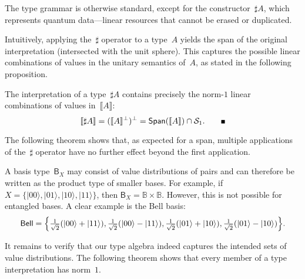 \documentclass[runningheads,orivec,envcountsame,envcountsect]{llncs}
\providecommand{\qed}{\hbox{\rule{1ex}{1ex}}}%
\newcommand\ket[1]{\ensuremath{|#1\rangle}}
\newcommand\Span[1]{\ensuremath{{\mathsf{Span}}{#1}}}
\def\Sph{\mathcal{S}_1}       %
\def\sem#1{\llbracket#1\rrbracket}
\newcommand\B{\mathbb B}
\newcommand\basis[1]{\ensuremath{\mathsf{B}_{#1}}}
\begin{document}
The type grammar is otherwise standard, except for the constructor~$\sharp A$,
which represents quantum data---linear resources that cannot be erased or
duplicated.  

Intuitively, applying the~$\sharp$ operator to a type~$A$ yields the span of the
original interpretation (intersected with the unit sphere).  This captures the
possible linear combinations of values in the unitary semantics of~$A$, as
stated in the following proposition.

\begin{theorem}\label{thm:SharpCharacterization}
  The interpretation of a type~$\sharp A$ contains precisely the
  norm-$1$ linear combinations of values in~$\sem{A}$:
  \[
    \sem{\sharp A}
    = (\sem{A}^\bot)^\bot
    = \Span(\sem{A}) \cap \Sph.
    \tag*{\qed}
  \]
\end{theorem}



The following theorem shows that, as expected for a span, multiple
applications of the~$\sharp$ operator have no further effect beyond the first
application.


\begin{remark}
  A basis type~$\basis{X}$ may consist of value distributions of pairs and can
  therefore be written as the product type of smaller bases. For example, if
  $X=\{\ket{00},\ket{01},\ket{10},\ket{11}\}$, then $\basis{X}=\B\times\B$.
  However, this is not possible for entangled bases. A clear example is the
  Bell basis:
  \[
    \mathsf{Bell}
    =\Bigl\{
      \tfrac{1}{\sqrt{2}}(\ket{00}+\ket{11}),
      \tfrac{1}{\sqrt{2}}(\ket{00}-\ket{11}),
      \tfrac{1}{\sqrt{2}}(\ket{01}+\ket{10}),
      \tfrac{1}{\sqrt{2}}(\ket{01}-\ket{10})
    \Bigr\}.
  \]
\end{remark}

It remains to verify that our type algebra indeed captures the intended sets of
value distributions. The following theorem shows that every member of a type
interpretation has norm~$1$.

\end{document}
